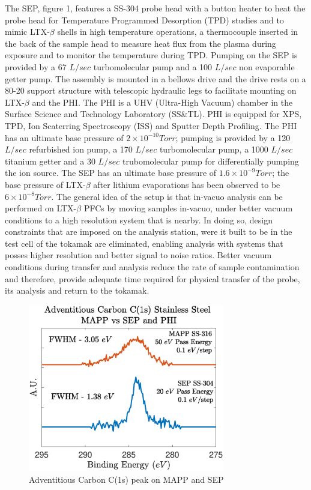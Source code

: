 \documentclass[aip,rsi,amsmath,amssymb,reprint]{revtex4-1}
\begin{document}
The SEP, figure 1, features a SS-304 probe head with a button heater to heat the probe head for Temperature Programmed Desorption (TPD) studies and to mimic LTX-$\beta$ shells in high temperature operations, a thermocouple inserted in the back of the sample head to measure heat flux from the plasma during exposure and to monitor the temperature during TPD. Pumping on the SEP is provided by a 67 $L/sec$ turbomolecular pump and a 100 $L/sec$ non evaporable getter pump. The assembly is mounted in a bellows drive and the drive rests on a 80-20 support structure with telescopic hydraulic legs to facilitate mounting on LTX-$\beta$ and the PHI. The PHI is a UHV (Ultra-High Vacuum) chamber in the Surface Science and Technology Laboratory (SS\&TL). PHI is equipped for XPS, TPD, Ion Scaterring Spectroscopy (ISS) and Sputter Depth Profiling. The PHI has an ultimate base pressure of $2 \times 10^{-10} Torr$; pumping is provided by a 120 $L/sec$ refurbished ion pump, a 170 $L/sec$ turbomolecular pump, a 1000 $L/sec$ titanium getter and a 30 $L/sec$ trubomolecular pump for differentially pumping the ion source. The SEP has an ultimate base pressure of $1.6 \times 10^{-9} Torr$; the base pressure of LTX-$\beta$ after lithium evaporations has been observed to be $6 \times 10^{-8} Torr$. The general idea of the setup is that in-vacuo analysis can be performed on LTX-$\beta$ PFCs by moving samples in-vacuo, under better vacuum conditions to a high resolution system that is nearby. In doing so, design constraints that are imposed on the analysis station, were it built to be in the test cell of the  tokamak are eliminated, enabling analysis with systems that posses higher resolution and better signal to noise ratios. Better vacuum conditions during transfer and analysis reduce the rate of sample contamination and therefore, provide adequate time required for physical transfer of the probe, its analysis and return to the tokamak. 

\begin{figure}%
\centering
\includegraphics[width=3.37in,keepaspectratio]{C1sMAPP_Comparr_20eV}%
\caption{Adventitious Carbon C(1s) peak on MAPP and SEP}
\end{figure}
\end{document}
